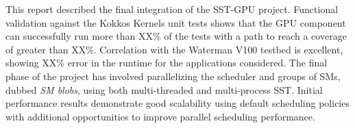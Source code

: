 This report described the final integration of the SST-GPU project.
Functional validation against the Kokkos Kernels unit tests shows that the GPU
component can successfully run more than XX\% of the tests with a path to reach
a coverage of greater than XX\%. Correlation with the Waterman V100 testbed is
excellent, showing XX\% error in the runtime for the applications considered.
The final phase of the project has involved parallelizing the scheduler and
groups of SMs, dubbed {\em SM blobs}, using both multi-threaded and
multi-process SST. Initial performance results demonstrate good scalability
using default scheduling policies with additional opportunities to improve
parallel scheduling performance.
